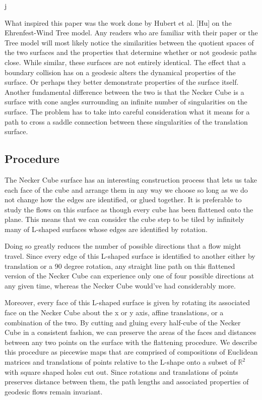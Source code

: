 j\documentclass[]{article}
\begin{document}
What inspired this paper was the work done by Hubert et al. [Hu] on the Ehrenfest-Wind Tree model. Any readers who are familiar with their paper or the Tree model will most likely notice the similarities between the quotient spaces of the two surfaces and the properties that determine whether or not geodesic paths close. While similar, these surfaces are not entirely identical. The effect that a boundary collision has on a geodesic alters the dynamical properties of the surface. Or perhaps they better demonstrate properties of the surface itself. Another fundamental difference between the two is that the Necker Cube is a surface with cone angles surrounding an infinite number of singularities on the surface. The problem has to take into careful consideration what it means for a path to cross a saddle connection between these singularities of the translation surface.



\subsection{Procedure}
The Necker Cube surface has an interesting construction process that lets us take each face of the cube and arrange them in any way we choose so long as we do not change how the edges are identified, or glued together. It is preferable to study the flows on this surface as though every cube has been flattened onto the plane. This means that we can consider the cube step to be tiled by infinitely many of L-shaped surfaces whose edges are identified by rotation.

Doing so greatly reduces the number of possible directions that a flow might travel. Since every edge of this L-shaped surface is identified to another either by translation or a 90 degree rotation, any straight line path on this flattened version of the Necker Cube can experience only one of four possible directions at any given time, whereas the Necker Cube would've had considerably more.

Moreover, every face of this L-shaped surface is given by rotating its associated face on the Necker Cube about the x or y axis, affine translations, or a combination of the two. By cutting and gluing every half-cube of the Necker Cube in a consistent fashion, we can preserve the areas of the faces and distances between any two points on the surface with the flattening procedure. We describe this procedure as piecewise maps that are comprised of compositions of Euclidean matrices and translations of points relative to the L-shape onto a subset of $\mathbb{R}^{2}$ with square shaped holes cut out. Since rotations and translations of points preserves distance between them, the path lengths and  associated properties of geodesic flows remain invariant.
\end{document}
